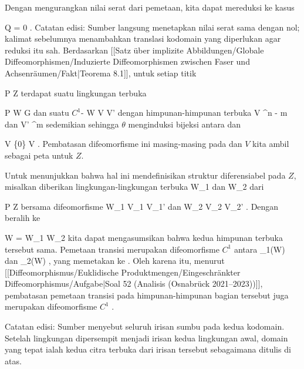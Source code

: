 {

Dengan mengurangkan nilai serat dari pemetaan, kita dapat mereduksi ke kasus

\mavergleichskette
{\vergleichskette
{ Q
}
{ = }{ 0
}
{  }{
}
{    }{
}
{   }{
}
}
{}{}{}
.
Catatan edisi: Sumber langsung menetapkan nilai serat sama dengan nol; kalimat sebelumnya menambahkan translasi kodomain yang diperlukan agar reduksi itu sah.
Berdasarkan
[[Satz über implizite Abbildungen/Globale Diffeomorphismen/Induzierte Diffeomorphismen zwischen Faser und Achsenräumen/Fakt|Teorema 8.1]],
untuk setiap titik

\mavergleichskette
{\vergleichskette
{ P
}
{ \in }{ Z
}
{  }{
}
{    }{
}
{   }{
}
}
{}{}{}
terdapat suatu lingkungan terbuka

\mavergleichskette
{\vergleichskette
{ P
}
{ \in }{ W
}
{ \subseteq }{ G
}
{    }{
}
{   }{
}
}
{}{}{}
dan suatu
$C^1$-
\maabbdisp {\theta} { W } { V \times V'
} {}
dengan himpunan-himpunan terbuka
\mathkor {} {V \subseteq \R^{n - m }} {dan} {V' \subseteq \R^m} {}
sedemikian sehingga $\theta$ menginduksi bijeksi antara
 dan

\mavergleichskette
{\vergleichskette
{ V \times \{0\}
}
{ \cong }{ V
}
{  }{
}
{    }{
}
{   }{
}
}
{}{}{}
.
Pembatasan difeomorfisme ini masing-masing pada
 dan $V$ kita ambil sebagai peta untuk $Z$.
\teilbeweis {}{}{}
{Untuk menunjukkan bahwa hal ini mendefinisikan struktur diferensiabel pada $Z$, misalkan diberikan lingkungan-lingkungan terbuka
 {} {}
\mathkor {} {W_1} {dan} {W_2} {}
dari

\mavergleichskette
{\vergleichskette
{ P
}
{ \in }{ Z
}
{  }{
}
{    }{
}
{   }{
}
}
{}{}{}
bersama difeomorfisme
 {W_1 } { V_1 \times V_1'
} {} dan  {W_2 } { V_2 \times V_2'
} {.}
Dengan beralih ke

\mavergleichskette
{\vergleichskette
{ W
}
{ = }{ W_1 \cap W_2
}
{  }{
}
{    }{
}
{   }{
}
}
{}{}{}
kita dapat mengasumsikan bahwa kedua himpunan terbuka tersebut sama. Pemetaan transisi
 merupakan difeomorfisme $C^1$ antara
 {} {}
\mathkor {} {\theta_1(W)} {dan} {\theta_2(W)} {,}
yang memetakan
 ke
. Oleh karena itu, menurut
[[Diffeomorphismus/Euklidische Produktmengen/Eingeschränkter Diffeomorphismus/Aufgabe|Soal 52 (Analisis (Osnabrück 2021--2023))]],
pembatasan pemetaan transisi pada himpunan-himpunan bagian tersebut juga merupakan difeomorfisme $C^1$
 {} {.}}
{}

Catatan edisi: Sumber menyebut seluruh irisan sumbu pada kedua kodomain. Setelah lingkungan dipersempit menjadi irisan kedua lingkungan awal, domain yang tepat ialah kedua citra terbuka dari irisan tersebut sebagaimana ditulis di atas.

}

